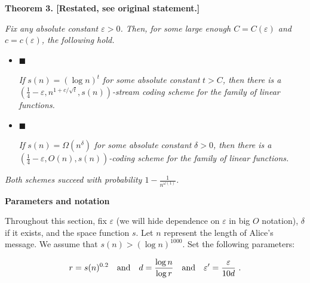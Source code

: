\documentclass[10pt,a4paper]{article}
\begin{document}
\par\medskip\noindent\textbf{
\textbf{Theorem 3}\textbf{.}
[Restated, see original statement.]}\par



\emph{Fix any absolute constant $\varepsilon>0$. Then, for some large enough
$C=C(\varepsilon)$ and $c=c(\varepsilon)$, the following hold.}\par


\begin{itemize}


\item[] 
$\blacksquare$ 


\emph{If }$s(n)=(\log n)^{t}$\emph{ for some absolute constant }$t>C$\emph{, then there is a }$\left(\frac{1}{4}-\varepsilon,n^{1+c/\sqrt{t}},s(n)\right)$\emph{-stream coding scheme for the family of linear functions.}\par





\item[] 
$\blacksquare$ 


\emph{If }$s(n)=\Omega(n^{\delta})$\emph{ for some absolute constant }$\delta>0$\emph{, then there is a }$\left(\frac{1}{4}-\varepsilon,O(n),s(n)\right)$\emph{-coding scheme for the family of linear functions.}\par





\end{itemize}


\emph{Both schemes succeed with probability $1-\frac{1}{n^{\omega(1)}}$.}\par







\par\medskip\noindent\textbf{Parameters and notation}\par




Throughout this section, fix $\varepsilon$ (we will hide dependence on $\varepsilon$ in big $O$ notation), $\delta$ if it exists, and the space function $s$. Let $n$ represent the length of Alice’s message.
We assume that $s(n)>(\log n)^{1000}$. Set the following parameters:\par


\[\begin{gathered}
r=s(n)^{0.2}\quad\text{and}\quad d=\frac{\log n}{\log r}\quad\text{and}\quad\varepsilon^{\prime}=\frac{\varepsilon}{10d}\nobreak\ .
\end{gathered}\]
\end{document}
